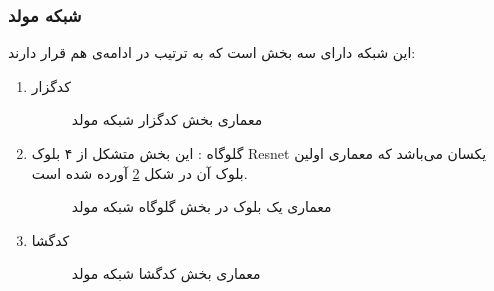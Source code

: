 \subsubsection{شبکه مولد}
این شبکه دارای سه بخش است که به ترتیب در ادامه‌ی هم قرار دارند:
\begin{enumerate}
	\item
	کدگزار
	\begin{figure}[H]
		\caption{معماری بخش‌ کدگزار شبکه مولد}
		\label{gen_arch_enc}
	\end{figure}

	\item
	گلوگاه
	:
	این بخش متشکل از ۴ بلوک Resnet یکسان می‌باشد که معماری اولین بلوک آن در شکل 
	\ref{gen_arch_bottleneck}
	آورده شده است.
	\begin{figure}[H]
		\caption{معماری یک بلوک
			در بخش گلوگاه شبکه مولد}
		\label{gen_arch_bottleneck}
	\end{figure}

	\item
	کدگشا
	\begin{figure}[H]
		\caption{معماری بخش کدگشا شبکه مولد}
		\label{gen_arch_dec}
	\end{figure}
\end{enumerate}

